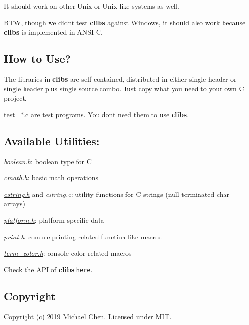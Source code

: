 It should work on other Unix or Unix-\/like systems as well.

B\+TW, though we didn\textquotesingle{}t test {\bfseries clibs} against Windows, it should also work because {\bfseries clibs} is implemented in A\+N\+SI C.

\subsection*{How to Use?}

The libraries in {\bfseries clibs} are self-\/contained, distributed in either single header or single header plus single source combo. Just copy what you need to your own C project.

test\+\_\+$\ast$.c are test programs. You don\textquotesingle{}t need them to use {\bfseries clibs}.

\subsection*{Available Utilities\+:}


\begin{DoxyItemize}
\item {\itshape \mbox{\hyperlink{boolean_8h}{boolean.\+h}}}\+: boolean type for C
\item {\itshape \mbox{\hyperlink{cmath_8h}{cmath.\+h}}}\+: basic math operations
\item {\itshape \mbox{\hyperlink{cstring_8h}{cstring.\+h}}} and {\itshape cstring.\+c}\+: utility functions for C strings (null-\/terminated {\ttfamily char} arrays)
\item {\itshape \mbox{\hyperlink{platform_8h}{platform.\+h}}}\+: platform-\/specific data
\item {\itshape \mbox{\hyperlink{print_8h}{print.\+h}}}\+: console printing related function-\/like macros
\item {\itshape \mbox{\hyperlink{term__color_8h}{term\+\_\+color.\+h}}}\+: console color related macros
\end{DoxyItemize}

Check the A\+PI of {\bfseries clibs} \href{https://cwchentw.github.io/clibs/html/index.html}{\tt here}.

\subsection*{Copyright}

Copyright (c) 2019 Michael Chen. Licensed under M\+IT. 